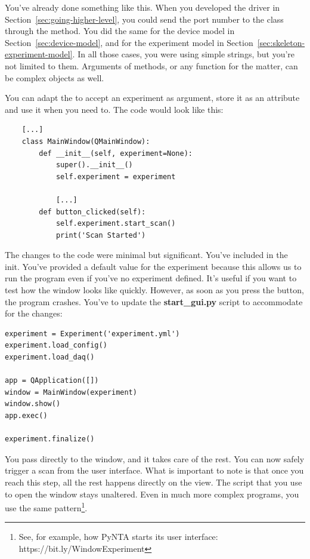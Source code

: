 You've already done something like this. When you developed the driver in Section~\ref{sec:going-higher-level}, you could send the port number to the class through the  method. You did the same for the device model in Section~\ref{sec:device-model}, and for the experiment model in Section~\ref{sec:skeleton-experiment-model}. In all those cases, you were using simple strings, but you're not limited to them. Arguments of methods, or any function for the matter, can be complex objects as well.

You can adapt the  to accept an experiment as argument, store it as an attribute and use it when you need to. The code would look like this:

\begin{verbatim}
    [...]
    class MainWindow(QMainWindow):
        def __init__(self, experiment=None):
            super().__init__()
            self.experiment = experiment

            [...]
        def button_clicked(self):
            self.experiment.start_scan()
            print('Scan Started')
\end{verbatim}

The changes to the code were minimal but significant. You've included  in the init. You've provided a default value for the experiment because this allows us to run the program even if you've no experiment defined. It's useful if you want to test how the window looks like quickly. However, as soon as you press the button, the program crashes. You've to update the \textbf{start\_gui.py} script to accommodate for the changes:

\begin{verbatim}
experiment = Experiment('experiment.yml')
experiment.load_config()
experiment.load_daq()

app = QApplication([])
window = MainWindow(experiment)
window.show()
app.exec()

experiment.finalize()
\end{verbatim}

You pass  directly to the window, and it takes care of the rest. You can now safely trigger a scan from the user interface. What is important to note is that once you reach this step, all the rest happens directly on the view. The script that you use to open the window stays unaltered. Even in much more complex programs, you use the same pattern\footnote{See, for example, how PyNTA starts its user interface: https://bit.ly/WindowExperiment}.

